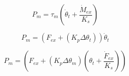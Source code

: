 \begin{equation}
\label{eq:SEA_power}
	P_{m} = \tau_{m} \left(\dot{\theta}_{t} + \frac{\dot{M}_{ex}}{K_{s}}\right)
\end{equation}

\begin{equation}
\label{eq:PEA_power}
	P_{m} = (F_{ex} + (K_{p} \Delta \theta_{t})) \dot{\theta}_{t}
\end{equation}

\begin{equation}
\label{eq:SEA_PEA_power}
	P_{m} = \left(F_{ex} + (K_{p} \Delta \theta_{m}) \left(\theta_{t} + \frac{\dot{F}_{ex}}{K_{s}}\right)\right)
\end{equation}


